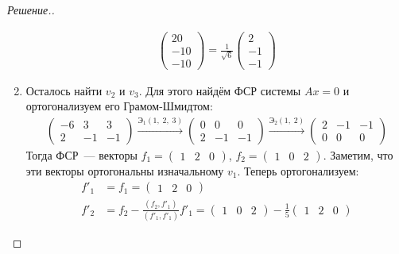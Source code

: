 \documentclass[a4paper]{article}
\theoremstyle{remark}
\newcommand{\arron}[3]{%
  \ensuremath{\xrightarrow{\text{Э}_1(#1,\; #2,\; #3)}}%
}
\newcommand{\arrtw}[2]{%
  \ensuremath{\xrightarrow{\text{Э}_2(#1,\; #2)}}%
}
\begin{document}
\begin{proof}[Решение.]
\begin{enumerate}
\begin{align*}
\begin{pmatrix}
                20 \\
                -10 \\
                -10
              \end{pmatrix} = \frac{1}{\sqrt{6}} \begin{pmatrix}
                2 \\
                -1 \\
                -1
              \end{pmatrix}
            \end{align*}
            \item Осталось найти $v_2$ и $v_3$. Для этого найдём ФСР системы $Ax = 0$ и ортогонализуем его Грамом-Шмидтом:
            \begin{align*}
              \begin{pmatrix}
                -6 & 3 & 3 \\
                2 & -1 & -1
              \end{pmatrix} \arron{1}{2}{3}
              \begin{pmatrix}
                0 & 0 & 0 \\
                2 & -1 & -1
              \end{pmatrix} \arrtw{1}{2} 
              \begin{pmatrix}
                2 & -1 & -1 \\
                0 & 0 & 0 
              \end{pmatrix}
            \end{align*}
            Тогда ФСР~--- векторы $f_1 = \begin{pmatrix}
              1 & 2 & 0
            \end{pmatrix}$, $f_2 = \begin{pmatrix}
              1 & 0 & 2
            \end{pmatrix}$. Заметим, что эти векторы ортогональны изначальному $v_1$. Теперь ортогонализуем:
            \begin{align*}
              f'_1 &= f_1 = \begin{pmatrix}
                1 & 2 & 0
              \end{pmatrix} \\
              f'_2 &= f_2 - \frac{(f_2, f'_1)}{(f'_1, f'_1)}f'_1 = \begin{pmatrix}
                1 & 0 & 2
              \end{pmatrix} - \frac{1}{5}\begin{pmatrix}
                1 & 2 & 0

\end{pmatrix}
\end{align*}
\end{enumerate}
\end{proof}
\end{document}
